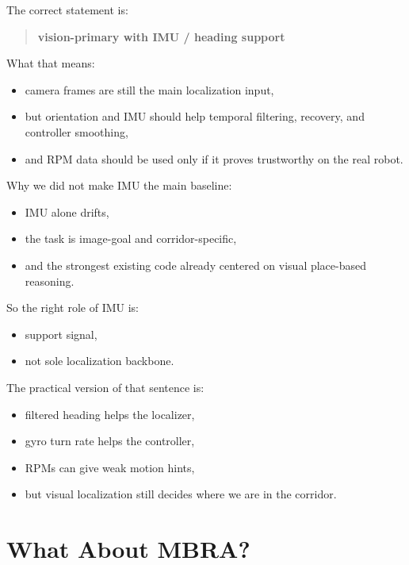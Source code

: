 \documentclass[11pt,a4paper]{article}
\begin{document}
The correct statement is:

\begin{quote}
\textbf{vision-primary with IMU / heading support}
\end{quote}

What that means:

\begin{itemize}[nosep]
  \item camera frames are still the main localization input,
  \item but orientation and IMU should help temporal filtering, recovery, and
        controller smoothing,
  \item and RPM data should be used only if it proves trustworthy on the real
        robot.
\end{itemize}

Why we did not make IMU the main baseline:

\begin{itemize}[nosep]
  \item IMU alone drifts,
  \item the task is image-goal and corridor-specific,
  \item and the strongest existing code already centered on visual place-based
        reasoning.
\end{itemize}

So the right role of IMU is:

\begin{itemize}[nosep]
  \item support signal,
  \item not sole localization backbone.
\end{itemize}

The practical version of that sentence is:

\begin{itemize}[nosep]
  \item filtered heading helps the localizer,
  \item gyro turn rate helps the controller,
  \item RPMs can give weak motion hints,
  \item but visual localization still decides where we are in the corridor.
\end{itemize}


\section{What About MBRA?}
\end{document}

